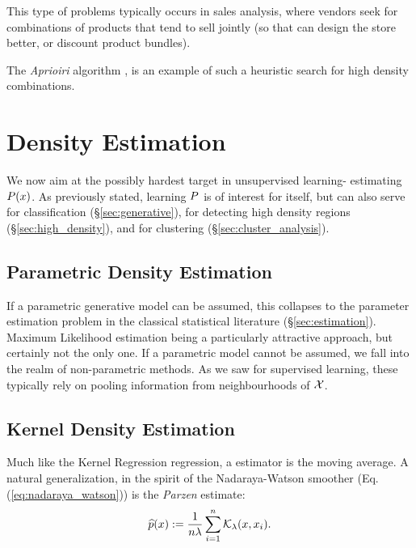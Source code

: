This type of problems typically occurs in sales analysis, where vendors seek for combinations of products that tend to sell jointly (so that can design the store better, or discount product bundles).

The \emph{Aprioiri} algorithm \cite{agraval_fast_1994}, is an example of such a heuristic search for high density combinations.






\section{Density Estimation}
\label{sec:density_estimation}

We now aim at the possibly hardest target in unsupervised learning- estimating $P(x)$.
As previously stated, learning $P$ is of interest for itself, but can also serve for classification (\S\ref{sec:generative}), for detecting high density regions (\S\ref{sec:high_density}), and for clustering (\S\ref{sec:cluster_analysis}).




\subsection{Parametric Density Estimation}
If a parametric generative model can be assumed, this collapses to the parameter estimation problem in the classical statistical literature (\S\ref{sec:estimation}). Maximum Likelihood estimation being a particularly attractive approach, but certainly not the only one.
If a parametric model cannot be assumed, we fall into the realm of non-parametric methods. 
As we saw for supervised learning, these typically rely on pooling information from neighbourhoods of $\mathcal{X}$.



\subsection{Kernel Density Estimation}
\label{sec:kernel_density}

Much like the Kernel Regression regression, a \naive estimator is the moving average.
A natural generalization, in the spirit of the Nadaraya-Watson smoother (Eq.(\ref{eq:nadaraya_watson})) is the \emph{Parzen} estimate:
\begin{align}
\label{eq:parzen}
	\widehat{p}(x):=\frac{1}{n \lambda} \sum_{i=1}^n \mathcal{K}_\lambda(x,x_i).
\end{align}

